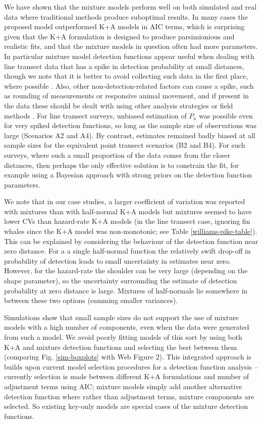 \documentclass[authoryear,preprint,review,12pt]{elsarticle}
\begin{document}
We have shown that the mixture models perform well on both simulated and real data where traditional methods produce suboptimal results. In many cases the proposed model outperformed K+A models in AIC terms, which is surprising given that the K+A formulation is designed to produce parsimionious and realistic fits, and that the mixture models in question often had more parameters. In particular mixture model detection functions appear useful when dealing with line transect data that has a spike in detection probability at small distances, though we note that it is better to avoid collecting such data in the first place, where possible \citep{Buckland:2001vm}.  Also, other non-detection-related factors can cause a spike, such as rounding of measurements or responsive animal movement, and if present in the data these should be dealt with using other analysis strategies or field methods \citep[see][]{Buckland:2001vm}.  For line transect surveys, unbiased estimation of $P_a$ was possible even for very spiked detection functions, so long as the sample size of observations was large (Scenarios A2 and A4).  By contrast, estimates remained badly biased at all sample sizes for the equivalent point transect scenarios (B2 and B4). For such surveys, where such a small proportion of the data comes from the closer distances, then perhaps the only effective solution is to constrain the fit, for example using a Bayesian approach with strong priors on the detection function parameters.

We note that in our case studies, a larger coefficient of variation was reported with mixtures than with half-normal K+A models but mixtures seemed to have lower CVs than hazard-rate K+A models (in the line transect case, ignoring fin whales since the K+A model was non-monotonic; see Table \ref{williams-pike-table}). This can be explained by considering the behaviour of the detection function near zero distance. For a a single half-normal function the relatively swift drop-off in probability of detection leads to small uncertainty in estimates near zero. However, for the hazard-rate the shoulder can be very large (depending on the shape parameter), so the uncertainty surrounding the estimate of detection probability at zero distance is large. Mixtures of half-normals lie somewhere in between these two options (summing smaller variances). 

Simulations show that small sample sizes do not support the use of mixture models with a high number of components, even when the data were generated from such a model. We avoid poorly fitting models of this sort by using both K+A and mixture detection functions and selecting the best between them (comparing Fig. \ref{sim-boxplots} with Web Figure 2). This integrated approach is builds upon current model selection procedures for a detection function analysis -- currently selection is made between different K+A formulations and number of adjustment terms using AIC; mixture models simply add another alternative detection function where rather than adjustment terms, mixture components are selected. So existing key-only models are special cases of the mixture detection functions.
\end{document}
